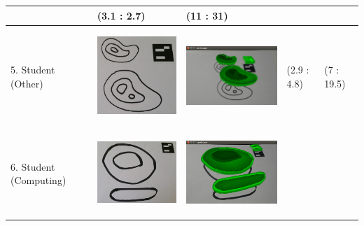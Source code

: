 \documentclass[11pt]{article}
\begin{document}
\begin{landscape}
\begin{longtable}{p{}| p{}| p{} | p{} |p{}}
							& (3.1 : 2.7)
							& (11 : 31)\\
\hline
5. Student (Other) & \begin{center}\includegraphics[scale=0.5]{pics/usertesting/5.png}\end{center} 
							& \begin{center}\includegraphics[scale=0.5]{pics/usertesting/5render.png}\end{center} 
							& (2.9 : 4.8)
							& (7 : 19.5)\\
\hline
6. Student (Computing) & \begin{center}\includegraphics[scale=0.5]{pics/usertesting/6.png}\end{center} 
							& \begin{center}\includegraphics[scale=0.5]{pics/usertesting/6render.png}\end{center} 

\end{longtable}
\end{landscape}
\end{document}
